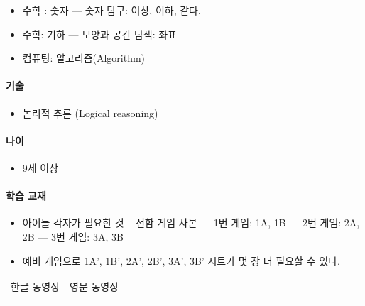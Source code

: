 \documentclass[]{article}
\begin{document}
\begin{itemize}
\itemsep1pt\parskip0pt
\item
  수학 : 숫자 --- 숫자 탐구: 이상, 이하, 같다.
\item
  수학: 기하 --- 모양과 공간 탐색: 좌표
\item
  컴퓨팅: 알고리즘(Algorithm)
\end{itemize}

\mbox{}\paragraph{기술}\label{section-89}

\begin{itemize}
\itemsep1pt\parskip0pt
\item
  논리적 추론 (Logical reasoning)
\end{itemize}

\mbox{}\paragraph{나이}\label{section-90}

\begin{itemize}
\itemsep1pt\parskip0pt
\item
  9세 이상
\end{itemize}

\mbox{}\paragraph{학습 교재}\label{section-91}

\begin{itemize}
\itemsep1pt\parskip0pt
\item
  아이들 각자가 필요한 것 -- 전함 게임 사본 --- 1번 게임: 1A, 1B --- 2번
  게임: 2A, 2B --- 3번 게임: 3A, 3B
\item
  예비 게임으로 1A', 1B', 2A', 2B', 3A', 3B' 시트가 몇 장 더 필요할 수
  있다.
\end{itemize}


\begin{longtable}[c]{@{}ll@{}}
\toprule
\begin{minipage}[t]{0.47\columnwidth}\raggedright\strut
한글 동영상
\strut\end{minipage} &
\begin{minipage}[t]{0.47\columnwidth}\raggedright\strut
영문 동영상
\strut\end{minipage}\tabularnewline
\begin{minipage}[t]{0.47\columnwidth}\raggedright\strut
\strut\end{minipage} &
\begin{minipage}[t]{0.47\columnwidth}\raggedright\strut
\strut\end{minipage}\tabularnewline
\bottomrule
\end{longtable}
\end{document}
